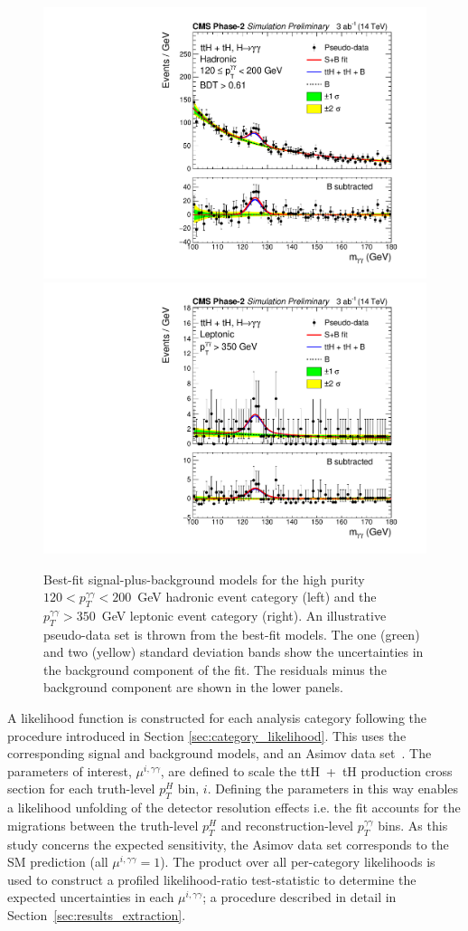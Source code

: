 \begin{figure}
  \centering
  \includegraphics[width=.49\textwidth]{Figures/cms/trilinear/CMS-PAS-FTR-18-020_Figure_004-a.pdf}
  \includegraphics[width=.49\textwidth]{Figures/cms/trilinear/CMS-PAS-FTR-18-020_Figure_005-f.pdf}
  \caption[Diphoton mass distributions for two event categories in the HL-LHC sensitivity study]
  {
     Best-fit signal-plus-background models for the high purity $120<p_T^{\gamma\gamma}<200$~GeV hadronic event category (left) and the $p_T^{\gamma\gamma}>350$~GeV leptonic event category (right). An illustrative pseudo-data set is thrown from the best-fit models. The one (green) and two (yellow) standard deviation bands show the uncertainties in the background component of the fit. The residuals minus the background component are shown in the lower panels.
  }
  \label{fig:trilinear_mgg}
\end{figure}

A likelihood function is constructed for each analysis category following the procedure introduced in Section \ref{sec:category_likelihood}. This uses the corresponding signal and background models, and an Asimov data set~\cite{Cowan:2010js}. The parameters of interest, $\mu^{i,\gamma\gamma}$, are defined to scale the ttH~+~tH production cross section for each truth-level $p_T^H$ bin, $i$. Defining the parameters in this way enables a likelihood unfolding of the detector resolution effects i.e. the fit accounts for the migrations between the truth-level $p_T^H$ and reconstruction-level $p_T^{\gamma\gamma}$ bins. As this study concerns the expected sensitivity, the Asimov data set corresponds to the SM prediction (all $\mu^{i,\gamma\gamma}=1$). The product over all per-category likelihoods is used to construct a profiled likelihood-ratio test-statistic to determine the expected uncertainties in each $\mu^{i,\gamma\gamma}$; a procedure described in detail in Section~\ref{sec:results_extraction}.

